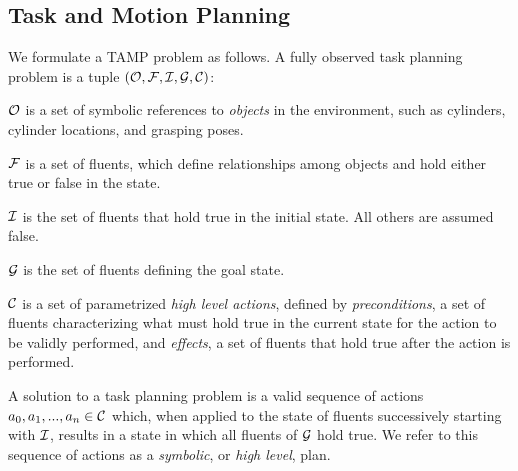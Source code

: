 \subsection{Task and Motion Planning}
We formulate a TAMP problem as follows. A fully observed task planning
problem is a tuple $(\mathcal{O}, \mathcal{F}, \mathcal{I}, \mathcal{G}, \mathcal{C})$:

$\mathcal{O}$ is a set of symbolic references to \emph{objects} in the environment,
such as cylinders, cylinder locations, and grasping poses.

$\mathcal{F}$ is a set of fluents, which define relationships among objects and hold either
true or false in the state.

$\mathcal{I}$ is the set of fluents that hold true in the initial state. All others are assumed false.

$\mathcal{G}$ is the set of fluents defining the goal state.

$\mathcal{C}$ is a set of parametrized \emph{high level actions}, defined by \emph{preconditions}, a set
of fluents characterizing what must hold true in the current state for the action
to be validly performed, and \emph{effects}, a set of fluents that hold true after
the action is performed.

A solution to a task planning problem is a valid sequence of actions
$a_{0}, a_{1}, ..., a_{n} \in \mathcal{C}$ which, when applied to the state of fluents
successively starting with $\mathcal{I}$, results in a state in which all fluents of
$\mathcal{G}$ hold true. We refer to this sequence of actions as a \emph{symbolic}, or
\emph{high level}, plan.





